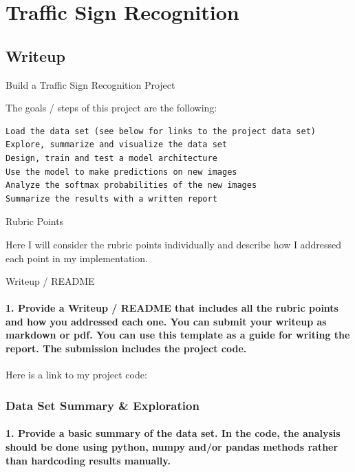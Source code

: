 \documentclass[11pt]{article}
\begin{document}
    \section{Traffic Sign Recognition}\label{traffic-sign-recognition}

\subsection{Writeup}\label{writeup}

Build a Traffic Sign Recognition Project

The goals / steps of this project are the following:

\begin{verbatim}
Load the data set (see below for links to the project data set)
Explore, summarize and visualize the data set
Design, train and test a model architecture
Use the model to make predictions on new images
Analyze the softmax probabilities of the new images
Summarize the results with a written report
\end{verbatim}

Rubric Points

Here I will consider the rubric points individually and describe how I
addressed each point in my implementation.

Writeup / README

\paragraph{1. Provide a Writeup / README that includes all the rubric
points and how you addressed each one. You can submit your writeup as
markdown or pdf. You can use this template as a guide for writing the
report. The submission includes the project
code.}\label{provide-a-writeup-readme-that-includes-all-the-rubric-points-and-how-you-addressed-each-one.-you-can-submit-your-writeup-as-markdown-or-pdf.-you-can-use-this-template-as-a-guide-for-writing-the-report.-the-submission-includes-the-project-code.}

Here is a link to my project code:

\subsubsection{Data Set Summary \&
Exploration}\label{data-set-summary-exploration}

\paragraph{1. Provide a basic summary of the data set. In the code, the
analysis should be done using python, numpy and/or pandas methods rather
than hardcoding results
manually.}\label{provide-a-basic-summary-of-the-data-set.-in-the-code-the-analysis-should-be-done-using-python-numpy-andor-pandas-methods-rather-than-hardcoding-results-manually.}
\end{document}
